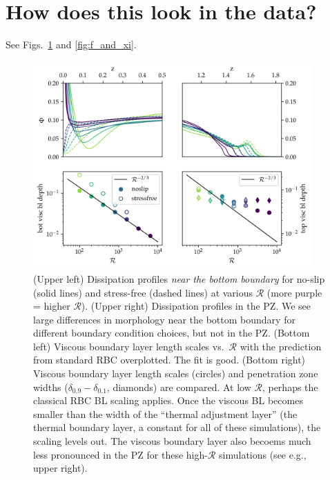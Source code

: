 \documentclass[12pt]{article}
\begin{document}
\section{How does this look in the data?}
See Figs.~\ref{fig:profiles} and \ref{fig:f_and_xi}.
\begin{figure}[ht!]
\centering
\includegraphics[width=0.95\textwidth]{viscous_boundary_layers.png}
\caption{
(Upper left) Dissipation profiles \emph{near the bottom boundary} for no-slip (solid lines) and stress-free (dashed lines) at various $\mathcal{R}$ (more purple = higher $\mathcal{R}$).
(Upper right) Dissipation profiles in the PZ.
We see large differences in morphology near the bottom boundary for different boundary condition choices, but not in the PZ.
(Bottom left) Viscous boundary layer length scales vs.~$\mathcal{R}$ with the prediction from standard RBC overplotted.
The fit is good.
(Bottom right) Viscous boundary layer length scales (circles) and penetration zone widths ($\delta_{0.9} - \delta_{0.1}$, diamonds) are compared.
At low $\mathcal{R}$, perhaps the classical RBC BL scaling applies.
Once the viscous BL becomes smaller than the width of the ``thermal adjustment layer'' (the thermal boundary layer, a constant for all of these simulations), the scaling levels out.
The viscous boundary layer also becoems much less pronounced in the PZ for these high-$\mathcal{R}$ simulations (see e.g., upper right).
\label{fig:profiles}
}
\end{figure}
\end{document}
